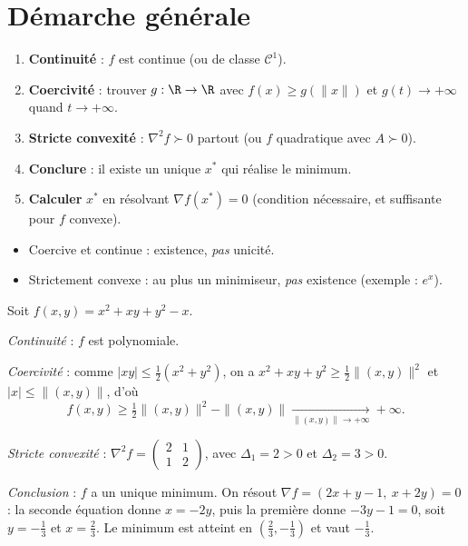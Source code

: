 
\section{Démarche générale}

\begin{methode}
\begin{enumerate}[label=\textbf{Étape \arabic*.}]
  \item \textbf{Continuité} : $f$ est continue (ou de classe $\mathcal C^1$).
  \item \textbf{Coercivité} : trouver $g:\R\to\R$ avec $f(x)\ge g(\|x\|)$ et $g(t)\to+\infty$ quand $t\to+\infty$.
  \item \textbf{Stricte convexité} : $\nabla^2f\succ0$ partout (ou $f$ quadratique avec $A\succ0$).
  \item \textbf{Conclure} : il existe un unique $x^*$ qui réalise le minimum.
  \item \textbf{Calculer} $x^*$ en résolvant $\nabla f(x^*)=0$ (condition nécessaire, et suffisante pour $f$ convexe).
\end{enumerate}
\end{methode}

\begin{attention}
\begin{itemize}
  \item Coercive et continue : existence, \emph{pas} unicité.
  \item Strictement convexe : au plus un minimiseur, \emph{pas} existence (exemple : $e^x$).
\end{itemize}
\end{attention}

\begin{exemple}
Soit $f(x,y)=x^2+xy+y^2-x$.

\emph{Continuité} : $f$ est polynomiale.

\emph{Coercivité} : comme $|xy|\le\frac12(x^2+y^2)$, on a $x^2+xy+y^2\ge\frac12\|(x,y)\|^2$ et $|x|\le\|(x,y)\|$, d'où
\[
  f(x,y)\ge\tfrac12\|(x,y)\|^2-\|(x,y)\|\xrightarrow[\|(x,y)\|\to+\infty]{}+\infty .
\]

\emph{Stricte convexité} : $\nabla^2f=\begin{pmatrix}2&1\\1&2\end{pmatrix}$, avec $\Delta_1=2>0$ et $\Delta_2=3>0$.

\emph{Conclusion} : $f$ a un unique minimum. On résout $\nabla f=(2x+y-1,\ x+2y)=0$ : la seconde équation donne $x=-2y$, puis la première donne $-3y-1=0$, soit $y=-\frac13$ et $x=\frac23$. Le minimum est atteint en $\left(\frac23,-\frac13\right)$ et vaut $-\frac13$.
\end{exemple}

